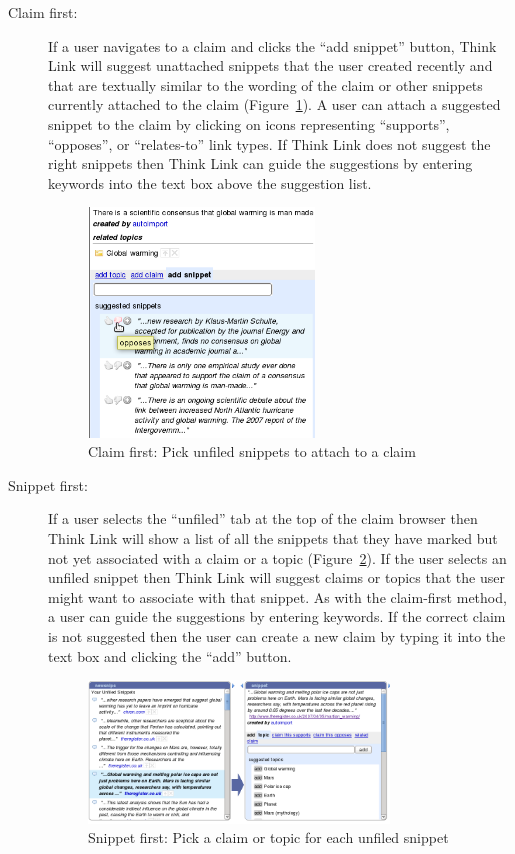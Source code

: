 \documentclass{chi2009}
\begin{document}
\begin{description}
\item[Claim first:] If a user navigates to a claim and clicks the ``add snippet'' button, Think Link will suggest unattached snippets that the user created recently and that are textually similar to the wording of the claim or other snippets currently attached to the claim (Figure~\ref{snipclaim}). A user can attach a suggested snippet to the claim by clicking on icons representing ``supports'', ``opposes'', or ``relates-to'' link types. If Think Link does not suggest the right snippets then Think Link can guide the suggestions by entering keywords into the text box above the suggestion list.

\begin{figure}[tb]
	\begin{center}
	\includegraphics[width=6cm]{../screenshots/v2_sugsnippet.png}
	\caption{Claim first: Pick unfiled snippets to attach to a claim}
	\label{snipclaim}
	\end{center}
\end{figure}

\item[Snippet first:] If a user selects the ``unfiled'' tab at the top of the claim browser then Think Link will show a list of all the snippets that they have marked but not yet associated with a claim or a topic (Figure~\ref{sniptopic}). If the user selects an unfiled snippet then Think Link will suggest claims or topics that the user might want to associate with that snippet. As with the claim-first method, a user can guide the suggestions by entering keywords. If the correct claim is not suggested then the user can create a new claim by typing it into the text box and clicking the ``add'' button.

\begin{figure}[tb]
	\begin{center}
	\includegraphics[width=8cm]{../screenshots/v2_sniptopic.png}
	\caption{Snippet first: Pick a claim or topic for each unfiled snippet}
	\label{sniptopic}
	\end{center}
\end{figure}


\end{description}
\end{document}

